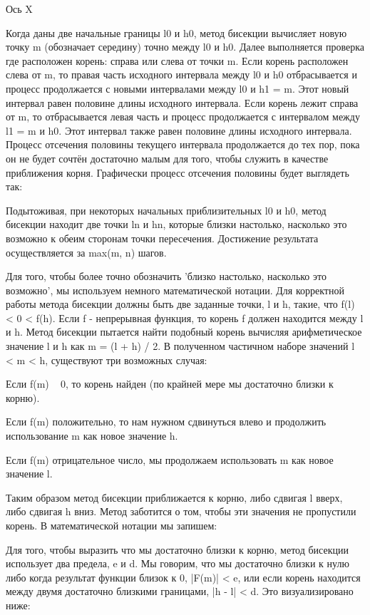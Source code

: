 Ось X

Когда даны две начальные границы l0 и h0, метод бисекции вычисляет новую точку m (обозначает середину) точно между l0 и h0. Далее выполняется проверка где расположен корень: справа или слева от точки m. Если корень расположен слева от m, то правая часть исходного интервала между l0 и h0 отбрасывается и процесс продолжается с новыми интервалами между l0 и h1 = m. Этот новый интервал равен половине длины исходного интервала. Если корень лежит справа от m, то отбрасывается левая часть и процесс продолжается с интервалом между l1 = m и h0. Этот интервал также равен половине длины исходного интервала. Процесс отсечения половины текущего интервала продолжается до тех пор, пока он не будет сочтён достаточно малым для того, чтобы служить в качестве приближения корня. Графически процесс отсечения половины будет выглядеть так:

Подытоживая, при некоторых начальных приблизительных l0 и h0, метод бисекции находит две точки ln и hn, которые близки настолько, насколько это возможно к обеим сторонам точки пересечения. Достижение результата осуществляется за max(m, n) шагов.

Для того, чтобы более точно обозначить 'близко настолько, насколько это возможно', мы используем немного математической нотации. Для корректной работы метода бисекции должны быть две заданные точки, l и h, такие, что f(l) < 0 < f(h). Если f - непрерывная функция, то корень f должен находится между l и h. Метод бисекции пытается найти подобный корень вычисляя арифметическое значение l и h как m = (l + h) / 2. В полученном частичном наборе значений l < m < h, существуют три возможных случая:

Если f(m) ~ 0, то корень найден (по крайней мере мы достаточно близки к корню).

Если f(m) положительно, то нам нужном сдвинуться влево и продолжить использование m как новое значение h.

Если f(m) отрицательное число, мы продолжаем использовать m как новое значение l.

Таким образом метод бисекции приближается к корню, либо сдвигая l вверх, либо сдвигая h вниз. Метод заботится о том, чтобы эти значения не пропустили корень. В математической нотации мы запишем:

Для того, чтобы выразить что мы достаточно близки к корню, метод бисекции использует два предела, e и d. Мы говорим, что мы достаточно близки к нулю либо когда результат функции близок к 0, |F(m)| < e, или если корень находится между двумя достаточно близкими границами, |h - l| < d. Это визуализировано ниже:

